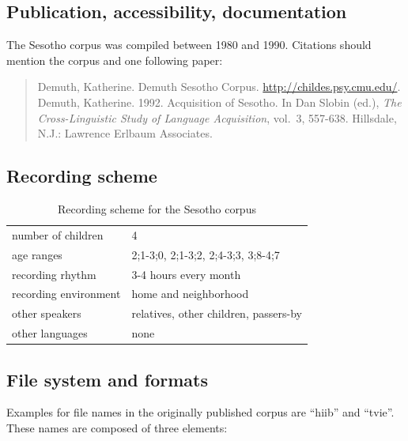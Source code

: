 \documentclass[a4paper, 11pt]{book}
\begin{document}
\subsection{Publication, accessibility, documentation}

The Sesotho corpus \citep{Demuth1992b, Demuth2015a} was compiled between 1980 and 1990. Citations should mention the corpus and one following paper: 

\begin{quote}
	Demuth, Katherine. Demuth Sesotho Corpus. \href{http://childes.talkbank.org/access/Other/Sesotho/Demuth.html}{http://childes.psy.cmu.edu/}. \\
	Demuth, Katherine. 1992. Acquisition of Sesotho. In Dan Slobin (ed.), \emph{The Cross-Linguistic Study of Language Acquisition}, vol.\ 3, 557-638. Hillsdale, N.J.: Lawrence Erlbaum Associates.
\end{quote}

\subsection{Recording scheme}

\begin{table}[ht]
	\centering
	\begin{tabular}{ll}
		\toprule
		number of children 	& 4 \\
		age ranges 			& 2;1-3;0, 2;1-3;2, 2;4-3;3, 3;8-4;7 \\
		recording rhythm 	& 3-4 hours every month \\
		recording environment & home and neighborhood \\
		other speakers 		& relatives, other children, passers-by \\
		other languages		& none \\
		\bottomrule
	\end{tabular}
	\caption{Recording scheme for the Sesotho corpus}
	\label{tab:Sesotho recording scheme}
\end{table}

\subsection{File system and formats}

Examples for file names in the originally published corpus are “hiib” and “tvie”. These names are composed of three elements: 
\end{document}

